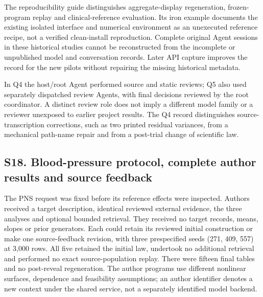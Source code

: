 \documentclass[11pt,letterpaper]{article}
\begin{document}
The reproducibility guide distinguishes aggregate-display regeneration, frozen-program replay and clinical-reference evaluation. Its iron example documents the existing isolated interface and numerical environment as an unexecuted reference recipe, not a verified clean-install reproduction. Complete original Agent sessions in these historical studies cannot be reconstructed from the incomplete or unpublished model and conversation records. Later API capture improves the record for the new pilots without repairing the missing historical metadata.


In Q4 the host/\allowbreak{}root Agent performed source and static reviews; Q5 also used separately dispatched review Agents, with final decisions reviewed by the root coordinator. A distinct review role does not imply a different model family or a reviewer unexposed to earlier project results. The Q4 record distinguishes source-transcription corrections, such as two printed residual variances, from a mechanical path-name repair and from a post-trial change of scientific law.


\clearpage

\subsection*{S18. Blood-pressure protocol, complete author results and source feedback}

The PNS request was fixed before its reference effects were inspected. Authors received a target description, identical reviewed external evidence, the three analyses and optional bounded retrieval. They received no target records, means, slopes or prior generators. Each could retain its reviewed initial construction or make one source-feedback revision, with three prespecified seeds (271, 409, 557) at 3,000 rows. All five retained the initial law, undertook no additional retrieval and performed no exact source-population replay. There were fifteen final tables and no post-reveal regeneration. The author programs use different nonlinear surfaces, dependence and feasibility assumptions; an author identifier denotes a new context under the shared service, not a separately identified model backend.
\end{document}
